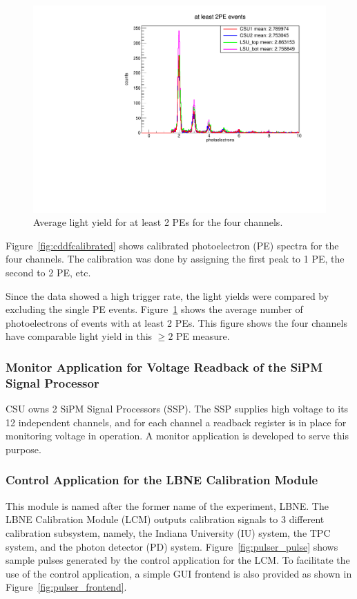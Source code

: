 \documentclass[12pt,a4paper,final]{iopart}
\begin{document}
\begin{figure}
  \centering
  \includegraphics[angle=270,origin=c,width=.7\textwidth]{figures/2015/avgPE.pdf}
  \caption{Average light yield for at least 2 PEs for the four channels.}
  \label{fig:cddfly}
\end{figure}

Figure~\ref{fig:cddfcalibrated} shows calibrated photoelectron (PE) spectra for the four channels. The calibration was done by assigning the first peak to 1 PE, the second to 2 PE, etc.

Since the data showed a high trigger rate, the light yields were compared by excluding the single PE events. Figure~\ref{fig:cddfly} shows the average number of photoelectrons of events with at least 2 PEs. This figure shows the four channels have comparable light yield in this $\ge 2$ PE measure.

\subsubsection{Monitor Application for Voltage Readback of the SiPM Signal Processor}

CSU owns 2 SiPM Signal Processors (SSP). The SSP supplies high voltage to its 12 independent channels, and for each channel a readback register is in place for monitoring voltage in operation. A monitor application is developed to serve this purpose.

\subsubsection{Control Application for the LBNE Calibration Module}

This module is named after the former name of the experiment, LBNE. The LBNE Calibration Module (LCM) outputs calibration signals to 3 different calibration subsystem, namely, the Indiana University (IU) system, the TPC system, and the photon detector (PD) system. Figure~\ref{fig:pulser_pulse} shows sample pulses generated by the control application for the LCM. To facilitate the use of the control application, a simple GUI frontend is also provided as shown in Figure~\ref{fig:pulser_frontend}.
\end{document}
